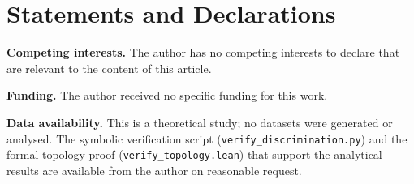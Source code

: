 \documentclass[pdflatex,sn-basic]{sn-jnl}
\theoremstyle{thmstyleone}
\numberwithin{proposition}{subsection}
\begin{document}
\section*{Statements and Declarations}

\noindent\textbf{Competing interests.} The author has no competing
interests to declare that are relevant to the content of this article.

\medskip
\noindent\textbf{Funding.} The author received no specific funding for
this work.

\medskip
\noindent\textbf{Data availability.} This is a theoretical study; no
datasets were generated or analysed. The symbolic verification script
(\texttt{verify\_discrimination.py}) and the formal topology proof
(\texttt{verify\_topology.lean}) that support the analytical results are
available from the author on reasonable request.



\end{document}
